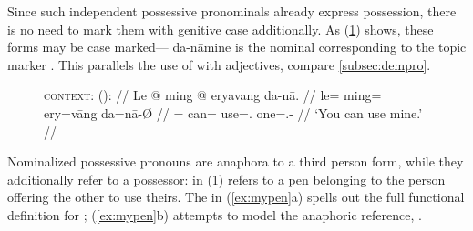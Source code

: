 Since such independent possessive pronominals already express possession, there
is no need to mark them with genitive case additionally. As
(\ref{ex:nomzposs}) shows, these forms may be case marked---
{da-nā}{mine} is the nominal corresponding to the topic marker .
This parallels the use of  with adjectives, compare
\autoref{subsec:dempro}.

\begin{figure}[h]
\ex\label{ex:nomzposs}%
\begingl
	\glpreamble \textsc{context}:  (\Inan): //
	\gla Le @ ming @ eryavang da-nā. //
	\glb le= ming= ery=vāng da=nā-Ø //
	\glc \PatTI{}= can= use=\Second{}.\Aarg{} one=\Fsg{}.\Gen{}-\Top{} //
	\glft `You can use mine.' //
\endgl
\xe
\end{figure}

Nominalized possessive pronouns are anaphora to a third person form, while they
additionally refer to a possessor:  in (\ref{ex:nomzposs})
refers to a pen belonging to the person offering the other to use theirs.
The \Avm{} in (\ref{ex:mypen}a) spells out the full functional definition for 
; (\ref{ex:mypen}b) attempts to model
the anaphoric reference, .

